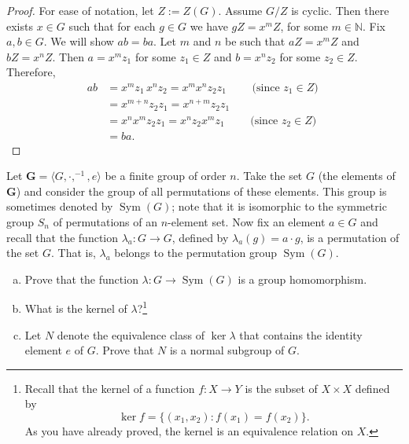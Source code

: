 \documentclass[12pt,reqno]{amsart}
\newcommand{\N}{\ensuremath{\mathbb{N}}}
\newcommand{\bG}{\ensuremath{\mathbf{G}}}
\newcommand{\<}{\ensuremath{\langle}}
\renewcommand{\>}{\ensuremath{\rangle}}
\newcommand{\Sym}{\ensuremath{\operatorname{Sym}}}
\begin{document}
\begin{enumerate}
\begin{enumerate}
\smallskip

\noindent
\begin{proof}
For ease of notation, let $Z := Z(G)$.  Assume 
$G/Z$ is cyclic. Then there exists $x\in G$ such that for each $g\in G$ 
  we have $gZ = x^mZ$, for some $m\in \N$.
  Fix $a, b\in G$.  We will show $ab = ba$.
  Let $m$ and $n$ be such that $aZ = x^mZ$ and $bZ = x^nZ$.
  Then $a = x^mz_1$ for some $z_1 \in Z$ and 
  $b = x^nz_2$ for some $z_2 \in Z$.  Therefore,
  \begin{align*}
    a b &= x^m z_1\, x^n z_2 = x^m x^n z_2 z_1 \qquad \text{ (since $z_1 \in Z$) }\\
    &= x^{m+n} z_2 z_1 = x^{n+m} z_2 z_1\\
    &= x^nx^m z_2 z_1 = x^nz_2 x^m z_1 \qquad \text{ (since $z_2 \in Z$) }\\
    &= b a.
  \end{align*}
\end{proof}
 
\end{enumerate}
 
\end{enumerate}

\bigskip

 Let $\bG = \<G, \cdot, ^{-1}, e\>$ be a finite group of order $n$.  
Take the set $G$ (the elements of $\bG$) and consider the group of all
permutations of these elements.  This group is sometimes denoted by $\Sym(G)$;
note that it is isomorphic to the symmetric group $S_n$ of permutations of
an $n$-element set.
Now fix an element $a\in G$ and recall that the function
$\lambda_a: G \rightarrow G$, defined by $\lambda_a(g) = a\cdot g$, is a
permutation of the set $G$.  That is, $\lambda_a$ belongs to the
permutation group $\Sym(G)$.


\medskip

\begin{enumerate}[(a)]
\item 
Prove that the function $\lambda: G \rightarrow \Sym(G)$ is a group
homomorphism.  

\medskip

\item What is the kernel of $\lambda$?\footnote{Recall that the kernel of a function $f: X \rightarrow Y$ is the subset of
  $X\times X$ defined by 
\[
\ker f = \{(x_1,x_2) : f(x_1) = f(x_2)\}.
\]
As you have already proved, the kernel is an equivalence relation on $X$.}


\medskip

\item Let $N$ denote the equivalence class of $\ker\lambda$ that contains the
  identity element $e$ of $G$.  Prove that $N$ is a normal subgroup of $G$.
\end{enumerate}
\end{document}
